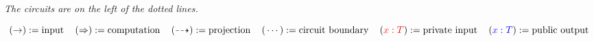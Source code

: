 \documentclass{article}
\begin{document}
\vspace{1em}

\begin{center}
    \emph{The circuits are on the left of the dotted lines.}
\end{center}

\vspace{3em}

\[
    (\rightarrow) := \text{input}
    \,\,\,\,\,\,\,
    (\Rightarrow) := \text{computation}
    \,\,\,\,\,\,\,
    (\dasharrow) := \text{projection}
    \,\,\,\,\,\,\,
    (\,\cdots\,) := \text{circuit boundary}
    \,\,\,\,\,\,\,
    ({\color{red}{x : T}}) := \text{private input}
    \,\,\,\,\,\,\,
    ({\color{blue}{x : T}}) := \text{public output}
\]
\end{document}
